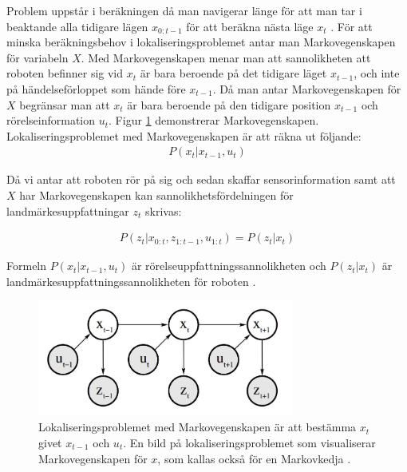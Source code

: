 Problem uppstår i beräkningen då man navigerar länge för att man tar i beaktande alla tidigare lägen $x_{0:t-1}$ för att beräkna nästa läge $x_t$ \citep{ProbabilisticRobotics}. För att minska beräkningsbehov i lokaliseringsproblemet antar man Markovegenskapen för variabeln $X$. Med Markovegenskapen menar man att sannolikheten att roboten befinner sig vid $x_t$ är bara beroende på det tidigare läget $x_{t-1}$, och inte på händelseförloppet som hände före $x_{t-1}$. Då man antar Markovegenskapen för $X$ begränsar man att $x_t$ är bara beroende på den tidigare position $x_{t-1}$ och rörelseinformation $u_t$. Figur \ref{markov} demonstrerar Markovegenskapen. Lokaliseringsproblemet med Markovegenskapen är att räkna ut följande:
\begin{align}
    P( x_t | x_{t-1}, u_{t})
\end{align}

Då vi antar att roboten rör på sig och sedan skaffar sensorinformation samt att $X$ har Markovegenskapen kan sannolikhetsfördelningen för landmärkesuppfattningar $z_t$ skrivas:

\begin{align}
    P(z_t | x_{0:t}, z_{1:t-1}, u_{1:t}) = P(z_t|x_t)
\end{align}

Formeln $P(x_t|x_{t-1}, u_{t})$ är rörelseuppfattningssannolikheten och $P(z_t|x_t)$ är landmärkesuppfattningssannolikheten för roboten \citep{ProbabilisticRobotics}. 

\begin{figure}[ht]
    \begin{center}
    \includegraphics[width=0.75\textwidth]{markov.JPG}
    \caption{Lokaliseringsproblemet med Markovegenskapen är att bestämma $x_t$ givet $x_{t-1}$ och $u_t$. En bild på lokaliseringsproblemet som visualiserar Markovegenskapen för $x$, som kallas också för en Markovkedja \citep{ProbabilisticRobotics}.}
    \label{markov}
    \end{center}
\end{figure}

